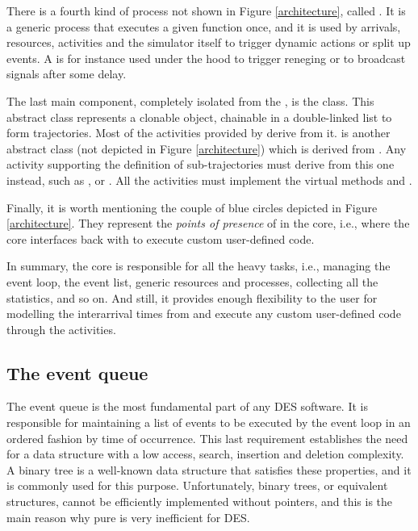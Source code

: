 \documentclass[
  nojss]{jss}
\begin{document}
There is a fourth kind of process not shown in Figure
\ref{architecture}, called . It is a generic process that
executes a given function once, and it is used by arrivals, resources,
activities and the simulator itself to trigger dynamic actions or split
up events. A  is for instance used under the hood to trigger
reneging or to broadcast signals after some delay.

The last main component, completely isolated from the ,
is the  class. This abstract class represents a clonable
object, chainable in a double-linked list to form trajectories. Most of
the activities provided by  derive from it.  is
another abstract class (not depicted in Figure \ref{architecture}) which
is derived from . Any activity supporting the definition
of sub-trajectories must derive from this one instead, such as
,  or . All the activities must
implement the virtual methods  and .

Finally, it is worth mentioning the couple of blue circles depicted in
Figure \ref{architecture}. They represent the \emph{points of presence}
of  in the  core, i.e., where the core
interfaces back with  to execute custom user-defined code.

In summary, the  core is responsible for all the heavy
tasks, i.e., managing the event loop, the event list, generic resources
and processes, collecting all the statistics, and so on. And still, it
provides enough flexibility to the user for modelling the interarrival
times from  and execute any custom user-defined code through
the activities.

\subsection{The event queue}\label{the-event-queue}

The event queue is the most fundamental part of any DES software. It is
responsible for maintaining a list of events to be executed by the event
loop in an ordered fashion by time of occurrence. This last requirement
establishes the need for a data structure with a low access, search,
insertion and deletion complexity. A binary tree is a well-known data
structure that satisfies these properties, and it is commonly used for
this purpose. Unfortunately, binary trees, or equivalent structures,
cannot be efficiently implemented without pointers, and this is the main
reason why pure  is very inefficient for DES.
\end{document}
